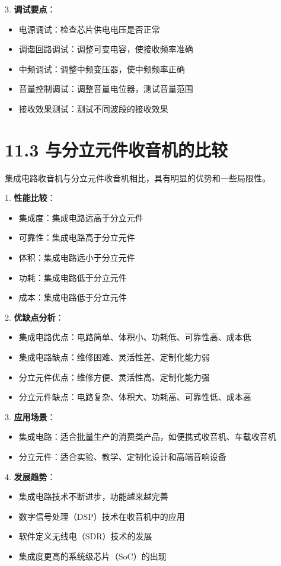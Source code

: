 \documentclass[12pt,UTF8]{ctexbook}
\begin{document}
3. \textbf{调试要点}：
   \begin{itemize}[leftmargin=3.5em]
   \item 电源调试：检查芯片供电电压是否正常
   \item 调谐回路调试：调整可变电容，使接收频率准确
   \item 中频调试：调整中频变压器，使中频频率正确
   \item 音量控制调试：调整音量电位器，测试音量范围
   \item 接收效果测试：测试不同波段的接收效果
   \end{itemize}

\section*{11.3 与分立元件收音机的比较}

集成电路收音机与分立元件收音机相比，具有明显的优势和一些局限性。

1. \textbf{性能比较}：
   \begin{itemize}[leftmargin=3.5em]
   \item 集成度：集成电路远高于分立元件
   \item 可靠性：集成电路高于分立元件
   \item 体积：集成电路远小于分立元件
   \item 功耗：集成电路低于分立元件
   \item 成本：集成电路低于分立元件
   \end{itemize}

2. \textbf{优缺点分析}：
   \begin{itemize}[leftmargin=3.5em]
   \item 集成电路优点：电路简单、体积小、功耗低、可靠性高、成本低
   \item 集成电路缺点：维修困难、灵活性差、定制化能力弱
   \item 分立元件优点：维修方便、灵活性高、定制化能力强
   \item 分立元件缺点：电路复杂、体积大、功耗高、可靠性低、成本高
   \end{itemize}

3. \textbf{应用场景}：
   \begin{itemize}[leftmargin=3.5em]
   \item 集成电路：适合批量生产的消费类产品，如便携式收音机、车载收音机
   \item 分立元件：适合实验、教学、定制化设计和高端音响设备
   \end{itemize}

4. \textbf{发展趋势}：
   \begin{itemize}[leftmargin=3.5em]
   \item 集成电路技术不断进步，功能越来越完善
   \item 数字信号处理（DSP）技术在收音机中的应用
   \item 软件定义无线电（SDR）技术的发展
   \item 集成度更高的系统级芯片（SoC）的出现
   \end{itemize}
\end{document}
